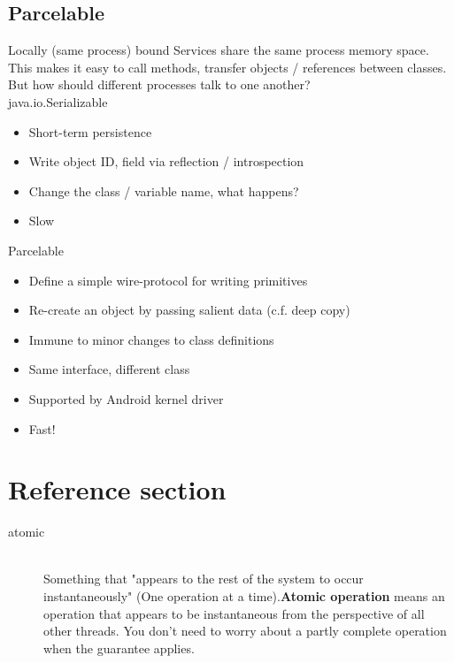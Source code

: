 \documentclass{article}
\begin{document}
\subsection{Parcelable}

\begin{flushleft}
Locally (same process) bound Services share the same process memory space. This makes it easy to call methods, transfer objects / references between classes. But how should different processes talk to one another? \\
java.io.Serializable
\begin{itemize}
  \item Short-term persistence
  \item Write object ID, field via reflection / introspection
  \item Change the class / variable name, what happens? 
  \item Slow
\end{itemize}
Parcelable
\begin{itemize}
  \item Define a simple wire-protocol for writing primitives
  \item Re-create an object by passing salient data (c.f. deep copy)
  \item Immune to minor changes to class definitions
  \item Same interface, different class
  \item Supported by Android kernel driver
  \item Fast!
\end{itemize}
\end{flushleft}

\newpage

\section*{Reference section} \label{sec:reference}
\begin{description}
	\item[atomic] \hfill \\ Something that "appears to the rest of the system to occur instantaneously" (One operation at a time).\textbf{Atomic operation} means an operation that appears to be instantaneous from the perspective of all other threads. You don't need to worry about a partly complete operation when the guarantee applies.
\end{description}
\end{document}
